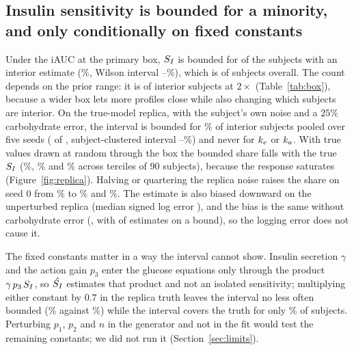 \subsection{Insulin sensitivity is bounded for a minority, and only conditionally on fixed constants}
\label{sec:si}

Under the iAUC at the primary box, $S_I$ is bounded for \resProfileIaucSIInteriorBoundedOne{} of the \resProfileIaucSIInteriorNOne{} subjects with an interior estimate (\resProfileIaucSIInteriorFracOne\%, Wilson interval \resProfileIaucSIInteriorFracOneLow--\resProfileIaucSIInteriorFracOneHigh\%), which is \resRealIaucSIBoundedAll{} of \resRealIaucN{} subjects overall.
The count depends on the prior range: it is \resBoxTwoSIBdAllCount{} of \resBoxTwoSIInt{} interior subjects at $2\times$ (Table~\ref{tab:box}), because a wider box lets more profiles close while also changing which subjects are interior.
On the true-model replica, with the subject's own noise and a $25\%$ carbohydrate error, the interval is bounded for \resSeedsSIBounded\% of interior subjects pooled over five seeds (\resSeedsSIBoundedCount{} of \resSeedsSIInterior{}, subject-clustered interval \resClustSILow--\resClustSIHigh\%) and never for $k_e$ or $k_a$.
With true values drawn at random through the box the bounded share falls with the true $S_I$ (\resSynthTercileSILow\%, \resSynthTercileSIMid\% and \resSynthTercileSIHigh\% across terciles of $90$ subjects), because the response saturates (Figure~\ref{fig:replica}).
Halving or quartering the replica noise raises the share on seed $0$ from \resNoiseOneIaucSI\% to \resNoiseHalfIaucSI\% and \resNoiseQuarterIaucSI\%.
The estimate is also biased downward on the unperturbed replica (median signed log error \resPertBaseBias), and the bias is the same without carbohydrate error (\resExactSIBias, with \resExactSIPinned{} of \resExactSIN{} estimates on a bound), so the logging error does not cause it.

The fixed constants matter in a way the interval cannot show.
Insulin secretion $\gamma$ and the action gain $p_3$ enter the glucose equations only through the product $\gamma\,p_3\,S_I$, so $\hat{S_I}$ estimates that product and not an isolated sensitivity; multiplying either constant by $0.7$ in the replica truth leaves the interval no less often bounded (\resPertGammaDownSIBounded\% against \resPertBaseSIBounded\%) while the interval covers the truth for only \resPertGammaDownSICover\% of subjects.
Perturbing $p_1$, $p_2$ and $n$ in the generator and not in the fit would test the remaining constants; we did not run it (Section~\ref{sec:limits}).

